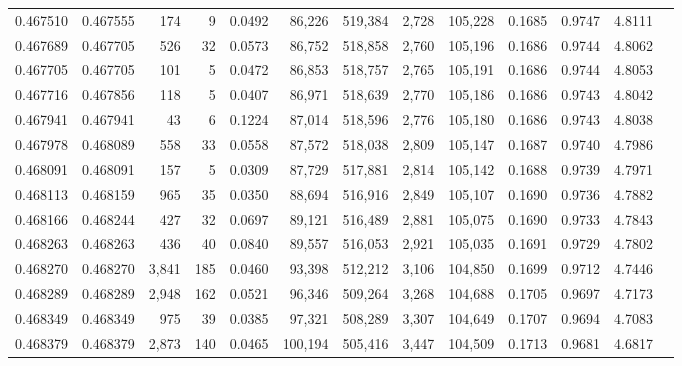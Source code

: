 \begin{tabular}{rrrrrrrrrrrrr}
0.467510 & 0.467555 &   174 &     9 &                                     0.0492 &  86,226 & 519,384 &   2,728 & 105,228 & 0.1685 & 0.9747 & 4.8111 \\
0.467689 & 0.467705 &   526 &    32 &                                     0.0573 &  86,752 & 518,858 &   2,760 & 105,196 & 0.1686 & 0.9744 & 4.8062 \\
0.467705 & 0.467705 &   101 &     5 &                                     0.0472 &  86,853 & 518,757 &   2,765 & 105,191 & 0.1686 & 0.9744 & 4.8053 \\
0.467716 & 0.467856 &   118 &     5 &                                     0.0407 &  86,971 & 518,639 &   2,770 & 105,186 & 0.1686 & 0.9743 & 4.8042 \\
0.467941 & 0.467941 &    43 &     6 &                                     0.1224 &  87,014 & 518,596 &   2,776 & 105,180 & 0.1686 & 0.9743 & 4.8038 \\
0.467978 & 0.468089 &   558 &    33 &                                     0.0558 &  87,572 & 518,038 &   2,809 & 105,147 & 0.1687 & 0.9740 & 4.7986 \\
0.468091 & 0.468091 &   157 &     5 &                                     0.0309 &  87,729 & 517,881 &   2,814 & 105,142 & 0.1688 & 0.9739 & 4.7971 \\
0.468113 & 0.468159 &   965 &    35 &                                     0.0350 &  88,694 & 516,916 &   2,849 & 105,107 & 0.1690 & 0.9736 & 4.7882 \\
0.468166 & 0.468244 &   427 &    32 &                                     0.0697 &  89,121 & 516,489 &   2,881 & 105,075 & 0.1690 & 0.9733 & 4.7843 \\
0.468263 & 0.468263 &   436 &    40 &                                     0.0840 &  89,557 & 516,053 &   2,921 & 105,035 & 0.1691 & 0.9729 & 4.7802 \\
0.468270 & 0.468270 & 3,841 &   185 &                                     0.0460 &  93,398 & 512,212 &   3,106 & 104,850 & 0.1699 & 0.9712 & 4.7446 \\
0.468289 & 0.468289 & 2,948 &   162 &                                     0.0521 &  96,346 & 509,264 &   3,268 & 104,688 & 0.1705 & 0.9697 & 4.7173 \\
0.468349 & 0.468349 &   975 &    39 &                                     0.0385 &  97,321 & 508,289 &   3,307 & 104,649 & 0.1707 & 0.9694 & 4.7083 \\
0.468379 & 0.468379 & 2,873 &   140 &                                     0.0465 & 100,194 & 505,416 &   3,447 & 104,509 & 0.1713 & 0.9681 & 4.6817 \\

\end{tabular}
